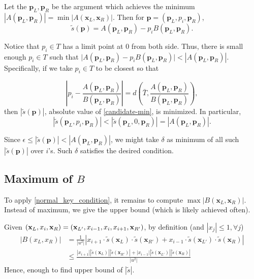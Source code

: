 \documentclass{article}
\theoremstyle{definition}
\theoremstyle{plain}
\theoremstyle{remark}
\numberwithin{equation}{section}
\newcommand{\abs}[1]{\left\lvert{#1}\right\rvert}
\begin{document}
Let the $\mathbf{p}_L, \mathbf{p}_R$ be the argument
which achieves the minimum $\abs{A(\mathbf{p}_L, \mathbf{p}_R)} = \min \abs{A(\mathbf{x}_L, \mathbf{x}_R)}$.
Then for $\mathbf{p} = (\mathbf{p}_L, p_i, \mathbf{p}_R)$,
\begin{equation}\label{candidate-min}
  \tilde{s}(\mathbf{p}) = A(\mathbf{p}_L, \mathbf{p}_R) - p_i B(\mathbf{p}_L, \mathbf{p}_R).
\end{equation}

Notice that $p_i \in T$ has a limit point at $0$ from both side.
Thus, there is small enough $p_i \in T$
such that $\lvert A(\mathbf{p}_L, \mathbf{p}_R) - p_i B(\mathbf{p}_L, \mathbf{p}_R) \rvert
< \abs{A(\mathbf{p}_L, \mathbf{p}_R)}$.
Specifically, if we take $p_i \in T$ to be closest so that

\[
  \abs{p_i - \frac{A(\mathbf{p}_L, \mathbf{p}_R)}{B(\mathbf{p}_L, \mathbf{p}_R)}}
  = d \left( \bar{T}, \frac{A(\mathbf{p}_L, \mathbf{p}_R)}{B(\mathbf{p}_L, \mathbf{p}_R)} \right),
\]
then $\abs{\tilde{s}(\mathbf{p})}$, absolute value of \eqref{candidate-min}, is minimized.
In particular,
\[
  \abs{\tilde{s}(\mathbf{p}_L, p_i, \mathbf{p}_R)}
  < \abs{\tilde{s}(\mathbf{p}_L, 0, \mathbf{p}_R)} = \abs{A(\mathbf{p}_L, \mathbf{p}_R)}.
\]

Since $\epsilon \leq \abs{\tilde{s}(\mathbf{p})} < \abs{A(\mathbf{p}_L, \mathbf{p}_R)}$,
we might take $\delta$ as minimum of all such $\abs{\tilde{s}(\mathbf{p})}$ over $i$'s.
Such $\delta$ satisfies the desired condition.

\subsection{Maximum of $B$}

To apply \eqref{normal_key_condition},
it remains to compute $\max \abs{B(\mathbf{x}_L, \mathbf{x}_R)}$.
Instead of maximum, we give the upper bound (which is likely achieved often).

Given $(\mathbf{x}_L, x_i, \mathbf{x}_R) = (\mathbf{x}_{L'}, x_{i-1}, x_i, x_{i+1}, \mathbf{x}_{R'})$,
by definition (and $\abs{x_j} \leq 1, \forall j$)
\begin{equation}\label{slope_upper_bound}
  \begin{aligned}
    \abs{B(x_L, x_R)}
    & = \frac{1}{\abs{u^2}}
    \abs{x_{i+1} \cdot \tilde{s}(\mathbf{x}_L) \cdot \tilde{s}(\mathbf{x}_{R'})
    + x_{i-1} \cdot \tilde{s}(\mathbf{x}_{L'}) \cdot \tilde{s}(\mathbf{x}_R)} \\
    & \leq \frac{\abs{x_{i+1}} \abs{\tilde{s}(\mathbf{x}_L)} \abs{\tilde{s}(\mathbf{x}_{R'})}
    + \abs{x_{i-1}} \abs{\tilde{s}(\mathbf{x}_{L'})} \abs{\tilde{s}(\mathbf{x}_R)}}{\abs{u^2}}
  \end{aligned}
\end{equation}
Hence, enough to find upper bound of $\abs{\tilde{s}}$.
\end{document}
